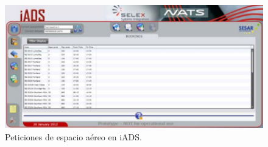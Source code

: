 \begin{figure}[H]
    \centering
    \includegraphics[width=1\linewidth]{figuras/iads_request.png}
    \caption{Peticiones de espacio aéreo en iADS.}
    \label{fig:iads_request}
\end{figure}